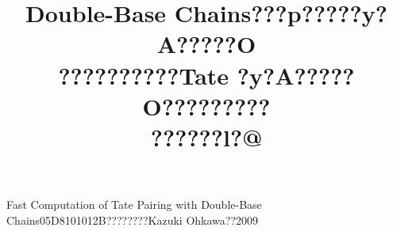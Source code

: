\documentclass[a4j,oneside,openany]{jsbook} %
\begin{document}
\title{Double-Base Chains???p?????y?A?????O\\??????????Tate ?y?A?????O?????????\\??????l?@}{Fast Computation of Tate Pairing with Double-Base Chains}{05D8101012B}{????????}{Kazuki Ohkawa}{??}{2009}
\setcounter{page}{1}


\newpage
\tableofcontents
\newpage











\end{document}
